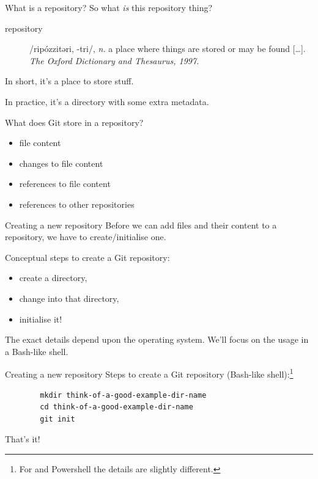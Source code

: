 \begin{frame}{What is a repository?}
    So what \emph{is} this repository thing?

    \begin{description}
        \item[repository] /ripózzitəri, -tri/, \emph{n.} a place where
            things are stored or may be found [\ldots].
            \emph{The Oxford Dictionary and Thesaurus, 1997.}
    \end{description}

    In short, it's a place to store stuff.

    In practice, it's a directory with some extra metadata.

    What does Git store in a repository?
    \begin{itemize}
        \item file content
        \item changes to file content
        \item references to file content
        \item references to other repositories
    \end{itemize}
\end{frame}

\begin{frame}{Creating a new repository}
    Before we can add files and their content to a repository, we have to
    create/initialise one.

    Conceptual steps to create a Git repository:
    \begin{itemize}
        \item create a directory,
        \item change into that directory,
        \item initialise it!
    \end{itemize}

    The exact details depend upon the operating system.  We'll focus on the
    usage in a Bash-like shell.
\end{frame}

\begin{frame}[fragile]{Creating a new repository}
    Steps to create a Git repository (Bash-like shell):\footnote[frame]{For
     and Powershell the details are slightly different.}
    \begin{verbatim}
        mkdir think-of-a-good-example-dir-name
        cd think-of-a-good-example-dir-name
        git init
    \end{verbatim}
    That's it!
\end{frame}

